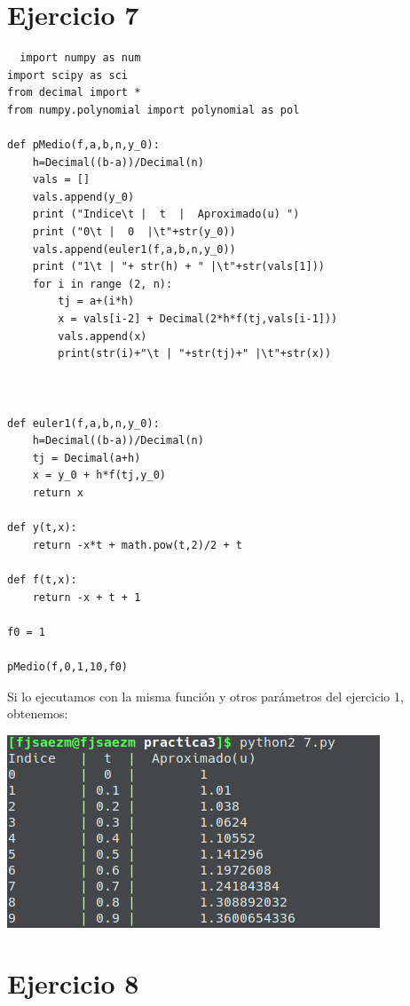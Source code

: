 \documentclass[11pt]{article}
\begin{document}
\section{Ejercicio 7}
\begin{lstlisting}
  import numpy as num
import scipy as sci
from decimal import *
from numpy.polynomial import polynomial as pol

def pMedio(f,a,b,n,y_0):
    h=Decimal((b-a))/Decimal(n)
    vals = []
    vals.append(y_0)
    print ("Indice\t |  t  |  Aproximado(u) ")
    print ("0\t |  0  |\t"+str(y_0))
    vals.append(euler1(f,a,b,n,y_0))
    print ("1\t | "+ str(h) + " |\t"+str(vals[1]))
    for i in range (2, n):
        tj = a+(i*h)
        x = vals[i-2] + Decimal(2*h*f(tj,vals[i-1]))
        vals.append(x)
        print(str(i)+"\t | "+str(tj)+" |\t"+str(x))



def euler1(f,a,b,n,y_0):
    h=Decimal((b-a))/Decimal(n)
    tj = Decimal(a+h)
    x = y_0 + h*f(tj,y_0)
    return x

def y(t,x):
	return -x*t + math.pow(t,2)/2 + t

def f(t,x):
    return -x + t + 1

f0 = 1

pMedio(f,0,1,10,f0)
\end{lstlisting}
Si lo ejecutamos con la misma función y otros parámetros del ejercicio 1, obtenemos:
\begin{center}
  \includegraphics[scale=0.4]{7.png}
\end{center}

\section{Ejercicio 8}
\end{document}
